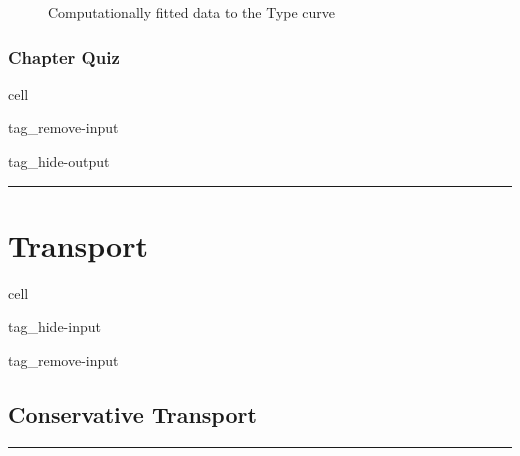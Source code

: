 \documentclass[letterpaper,10pt,english]{jupyterBook}
\begin{document}
\begin{figure}[htbp]
\centering
\capstart

\noindent{}
\caption{Computationally fitted data to the Type curve}\label{\detokenize{content/flow/L8/18_wells:type-cur-com}}\end{figure}


\section{Chapter Quiz}
\label{\detokenize{content/flow/L8/18_wells:chapter-quiz}}
\begin{sphinxuseclass}{cell}
\begin{sphinxuseclass}{tag_remove-input}
\begin{sphinxuseclass}{tag_hide-output}
\end{sphinxuseclass}
\end{sphinxuseclass}
\end{sphinxuseclass}

\bigskip\hrule\bigskip


\sphinxstepscope


\part{Transport}

\sphinxstepscope

\begin{sphinxuseclass}{cell}
\begin{sphinxuseclass}{tag_hide-input}
\begin{sphinxuseclass}{tag_remove-input}
\end{sphinxuseclass}
\end{sphinxuseclass}
\end{sphinxuseclass}

\chapter{Conservative Transport}
\label{\detokenize{content/transport/L9/21_conservative_transport:conservative-transport}}\label{\detokenize{content/transport/L9/21_conservative_transport::doc}}

\bigskip\hrule\bigskip
\end{document}
